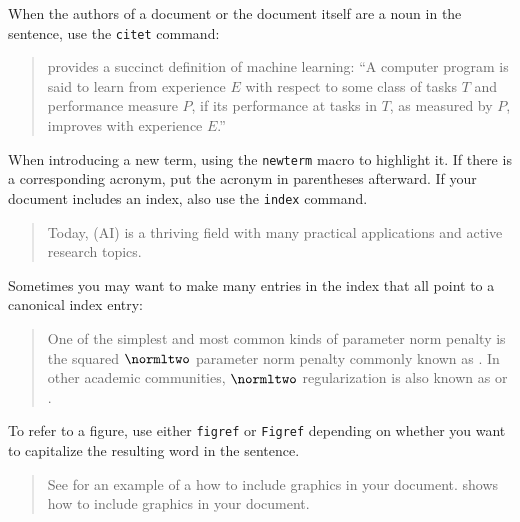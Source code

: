 When the authors of a document or the document itself are a noun in the
sentence, use the {\tt citet} command:

\begin{quote}
\citet{Mitchell:1997:ML} provides a succinct definition of machine learning:
``A computer program is said to learn from experience $E$ with respect to some
class of tasks $T$ and performance measure $P$, if its performance at tasks in
$T$, as measured by $P$, improves with experience $E$.''
\end{quote}

When introducing a new term, using the {\tt newterm} macro to highlight it.
If there is a corresponding acronym, put the acronym in parentheses
afterward. If your document includes an index, also use the {\tt index}
command.

\begin{quote}
Today,  (AI) is
a thriving field with many practical applications and active research topics.
\end{quote}

Sometimes you may want to make many entries in the index that all point
to a canonical index entry:

\begin{quote}
One of the simplest
and most common kinds of parameter norm penalty is
the squared $\normltwo$ parameter norm penalty
commonly known as .
In other academic communities,
$\normltwo$ regularization is also known as 
or .
\end{quote}

To refer to a figure, use either {\tt figref} or {\tt Figref} depending on
whether you want to capitalize the resulting word in the sentence.

\begin{quote}
See  for an example of a how to include graphics
in your document.
 shows how to include graphics in your document.
\end{quote}


